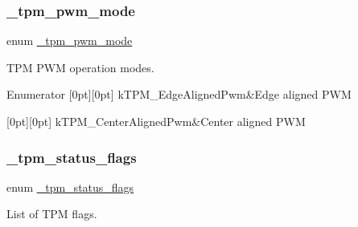 \subsubsection{\texorpdfstring{\_tpm\_pwm\_mode}{\_tpm\_pwm\_mode}}
{\footnotesize\ttfamily enum \mbox{\hyperlink{group__tpm_gad7846db814bfb6055814736b8325b668}{\+\_\+tpm\+\_\+pwm\+\_\+mode}}}



T\+PM P\+WM operation modes. 

\begin{DoxyEnumFields}{Enumerator}
[0pt][0pt]{}\mbox{\label{group__tpm_ggad7846db814bfb6055814736b8325b668ac3655841b72d48d51513dbe7bfe2c6fe}} 
k\+T\+P\+M\+\_\+\+Edge\+Aligned\+Pwm&Edge aligned P\+WM \\
\hline

[0pt][0pt]{}\mbox{\label{group__tpm_ggad7846db814bfb6055814736b8325b668a9e201f84919cf715746382741a708263}} 
k\+T\+P\+M\+\_\+\+Center\+Aligned\+Pwm&Center aligned P\+WM \\
\hline

\end{DoxyEnumFields}
\mbox{\label{group__tpm_ga8ebc3984cb11aef22f97788dc996620f}} 
\subsubsection{\texorpdfstring{\_tpm\_status\_flags}{\_tpm\_status\_flags}}
{\footnotesize\ttfamily enum \mbox{\hyperlink{group__tpm_ga8ebc3984cb11aef22f97788dc996620f}{\+\_\+tpm\+\_\+status\+\_\+flags}}}



List of T\+PM flags. 

